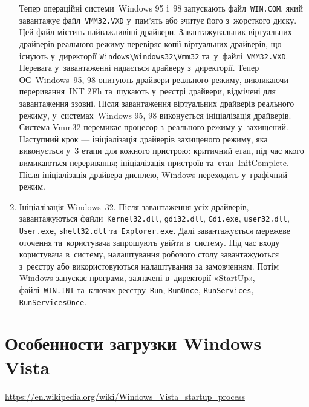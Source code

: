 \documentclass[
	a4paper,
	oneside,
	DIV = 14,
	fontsize = 14pt,
	headings = normal,
]{scrartcl}
\newcommand{\filename}[1]{\texttt{\textenglish{#1}}}
\newcommand{\regkey}[1]{\texttt{\textenglish{#1}}}
\begin{document}
\begin{enumerate}
				Тепер операційні системи~\textenglish{Windows} 95 і~98 запускають файл~\filename{WIN.COM}, який завантажує файл~\filename{VMM32.VXD} у~пам'ять або зчитує його з~жорсткого диску. Цей файл містить найважливіші драйвери. Завантажувальник віртуальних драйверів реального режиму перевіряє копії віртуальних драйверів, що існують у~директорії \filename{Windows\textbackslash{}Windows32\textbackslash{}Vmm32} та~у~файлі~\filename{VMM32.VXD}. Перевага у~завантаженні надається драйверу з~директорії. Тепер ОС~\textenglish{Windows~95, 98} опитують драйвери реального режиму, викликаючи переривання~\textenglish{INT 2Fh} та~шукають у~реєстрі драйвери, відмічені для завантаження ззовні. Після завантаження віртуальних драйверів реального режиму, у~системах~\textenglish{Windows 95, 98} виконується ініціалізація драйверів. Система \textenglish{Vmm32} перемикає процесор з~реального режиму у~захищений. Наступний крок — ініціалізація драйверів захищеного режиму, яка виконується у~3 етапи для кожного пристрою: критичний етап, під час якого вимикаються переривання; ініціалізація пристроїв та~етап~\textenglish{InitComplete}. Після ініціалізація драйвера дисплею, \textenglish{Windows} переходить у~графічний режим.
			\item Ініціалізація \textenglish{Windows~32}. Після завантаження усіх драйверів, завантажуються файли~\filename{Kernel32.dll}, \filename{gdi32.dll}, \filename{Gdi.exe}, \filename{user32.dll}, \filename{User.exe}, \filename{shell32.dll} та~\filename{Explorer.exe}. Далі завантажується мережеве оточення та~користувача запрошують увійти в~систему. Під час входу користувача в~систему, налаштування робочого столу завантажуються з~реєстру або використовуються налаштування за замовченням. Потім \textenglish{Windows} запускає програми, зазначені в~директорії «\textenglish{StartUp}», файлі~\filename{WIN.INI} та~ключах реєстру~\regkey{Run}, \regkey{RunOnce}, \regkey{RunServices}, \regkey{RunServicesOnce}. 
		\end{enumerate}

	\section{Особенности загрузки \textenglish{Windows Vista}}
		\url{https://en.wikipedia.org/wiki/Windows_Vista_startup_process}
\end{document}
